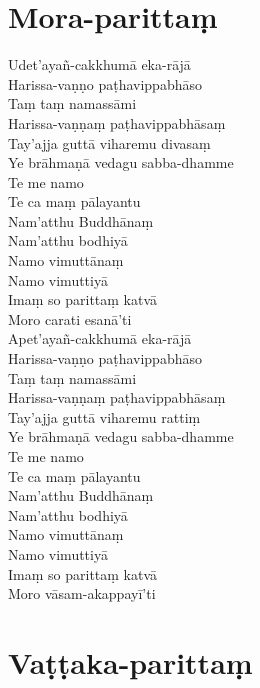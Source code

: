 \chapter{Mora-parittaṃ}%


\begin{paritta}
Udet'ayañ-cakkhumā eka-rājā\\
Harissa-vaṇṇo paṭhavippabhāso\\
Taṃ taṃ namassāmi\\
Harissa-vaṇṇaṃ paṭhavippabhāsaṃ\\
Tay'ajja guttā viharemu divasaṃ\\
Ye brāhmaṇā vedagu sabba-dhamme\\
Te me namo\\
Te ca maṃ pālayantu\\
Nam'atthu Buddhānaṃ\\
Nam'atthu bodhiyā\\
Namo vimuttānaṃ\\
Namo vimuttiyā\\
Imaṃ so parittaṃ katvā\\
Moro carati esanā'ti\\
Apet'ayañ-cakkhumā eka-rājā\\
Harissa-vaṇṇo paṭhavippabhāso\\
Taṃ taṃ namassāmi\\
Harissa-vaṇṇaṃ paṭhavippabhāsaṃ\\
Tay'ajja guttā viharemu rattiṃ\\
Ye brāhmaṇā vedagu sabba-dhamme\\
Te me namo\\
Te ca maṃ pālayantu\\
Nam'atthu Buddhānaṃ\\
Nam'atthu bodhiyā\\
Namo vimuttānaṃ\\
Namo vimuttiyā\\
Imaṃ so parittaṃ katvā\\
Moro vāsam-akappayī'ti

\end{paritta}

\chapter{Vaṭṭaka-parittaṃ}%


